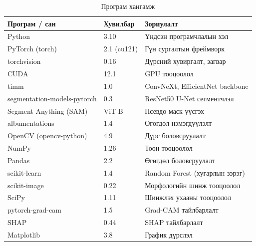 \begin{table}[ht]
    \centering
    \begin{tabular}{|l|l|l|}
    \hline
    \textbf{Програм / сан} & \textbf{Хувилбар} & \textbf{Зориулалт} \\ \hline
    Python                       & 3.10            & Үндсэн програмчлалын хэл \\ \hline
    PyTorch (torch)              & 2.1 (cu121)     & Гүн сургалтын фреймворк \\ \hline
    torchvision                  & 0.16            & Дүрсний хувиргалт, загвар \\ \hline
    CUDA                         & 12.1            & GPU тооцоолол \\ \hline
    timm                         & 1.0             & ConvNeXt, EfficientNet backbone \\ \hline
    segmentation-models-pytorch  & 0.3             & ResNet50 U-Net сегментчлэл \\ \hline
    Segment Anything (SAM)       & ViT-B           & Псевдо маск үүсгэх \\ \hline
    albumentations               & 1.4             & Өгөгдөл нэмэгдүүлэлт \\ \hline
    OpenCV (opencv-python)       & 4.9             & Дүрс боловсруулалт \\ \hline
    NumPy                        & 1.26            & Тоон тооцоолол \\ \hline
    Pandas                       & 2.2             & Өгөгдөл боловсруулалт \\ \hline
    scikit-learn                 & 1.4             & Random Forest (хугарлын зэрэг) \\ \hline
    scikit-image                 & 0.22            & Морфологийн шинж тооцоолол \\ \hline
    SciPy                        & 1.11            & Шинжлэх ухааны тооцоолол \\ \hline
    pytorch-grad-cam             & 1.5             & Grad-CAM тайлбарлалт \\ \hline
    SHAP                         & 0.44            & SHAP тайлбарлалт \\ \hline
    Matplotlib                   & 3.8             & График дүрслэл \\ \hline
    \end{tabular}
    \caption{Програм хангамж}
    \label{tab:appH_sw}
\end{table}

